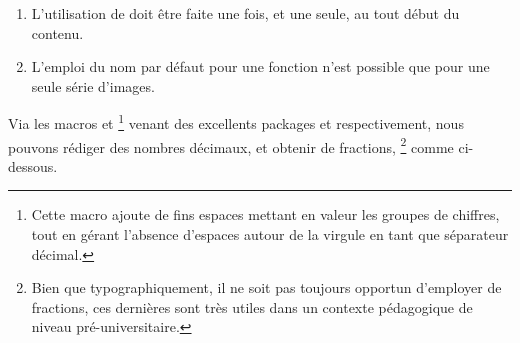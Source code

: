 \documentclass{tutodoc}
\begin{document}
\begin{tdocwarn}
	\begin{enumerate}[wide]
		\item L'utilisation de  doit être faite une fois, et une seule, au tout début du contenu.

		\item L'emploi du nom par défaut pour une fonction n'est possible que pour une seule série d'images.
	\end{enumerate}
\end{tdocwarn}




\begin{tdocexa}
    \leavevmode

\end{tdocexa}




\begin{tdocexa}
    \leavevmode

\end{tdocexa}




\begin{tdocexa}
    \leavevmode

\end{tdocexa}



\begin{tdoctip}
%
    Via les macros  et %
    \footnote{
    	Cette macro ajoute de fins espaces mettant en valeur les groupes de chiffres, tout en gérant l'absence d'espaces autour de la virgule en tant que séparateur décimal.
    }
    venant des excellents packages  et  respectivement,
    nous pouvons rédiger des nombres décimaux, et obtenir de  fractions,%
    \footnote{
    	Bien que typographiquement, il ne soit pas toujours opportun d'employer de  fractions, ces dernières sont très utiles dans un contexte pédagogique de niveau pré-universitaire.
    }
    comme ci-dessous.

\end{tdoctip}
\end{document}
